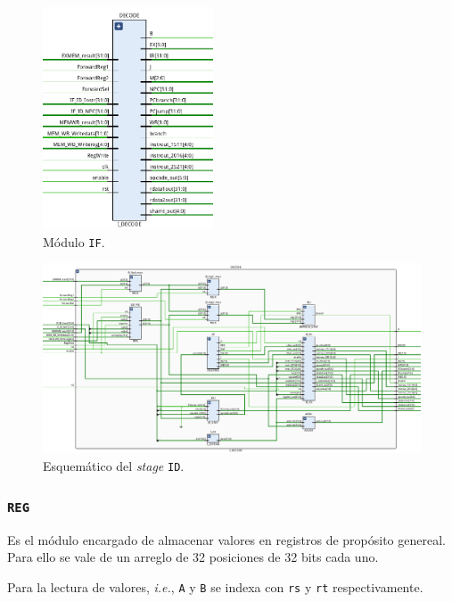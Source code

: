 \documentclass[a4paper]{article}
\begin{document}
\begin{figure}[H]
	\begin{center}				
	\includegraphics[width=0.45\textwidth]{ID_1.png}
  	\caption{Módulo \texttt{IF}.}
  	\label{fig:funcionamiento.}
  	\end{center}
\end{figure}

\begin{figure}[H]
	\begin{center}				
	\includegraphics[width=1.35\textwidth,center]{ID_2.png}
  	\caption{Esquemático del \textit{stage} \texttt{ID}.}
  	\label{fig:funcionamiento.}
  	\end{center}
\end{figure}

\subsubsection{\texttt{REG}}
Es el módulo encargado de almacenar valores en registros de propósito genereal. Para ello se vale de un arreglo de 32 posiciones de 32 bits cada uno. 

Para la lectura de valores, \textit{i.e.}, \texttt{A} y \texttt{B} se indexa con \texttt{rs} y \texttt{rt} respectivamente.
\end{document}
